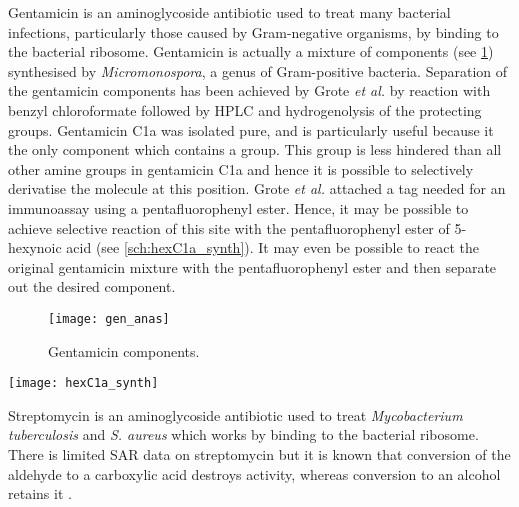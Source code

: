 Gentamicin is an aminoglycoside antibiotic used to treat many bacterial infections, particularly those caused by Gram-negative organisms, by binding to the bacterial ribosome. Gentamicin is actually a mixture of components (see \ref{fgr:gen_anas}) synthesised by \textit{Micromonospora}, a genus of Gram-positive bacteria. Separation of the gentamicin components has been achieved by Grote \textit{et al.} \cite{Grote2012} by reaction with benzyl chloroformate followed by HPLC and hydrogenolysis of the protecting groups. 
Gentamicin C1a  was isolated pure, and is particularly useful because it the only component which contains a  group. This group is less hindered than all other amine groups in gentamicin C1a  and hence it is possible to selectively derivatise the molecule at this position. Grote \textit{et al.} attached a tag needed for an immunoassay using a pentafluorophenyl ester\cite{Cheshev2010}. Hence, it may be possible to achieve selective reaction of this site with the pentafluorophenyl ester of 5-hexynoic acid  (see \ref{sch:hexC1a_synth}). It may even be possible to react the original gentamicin mixture with the pentafluorophenyl ester  and then separate out the desired component.

\begin{figure}[H]
	\begin{center}
		\texttt{[image: gen\_anas]}
		\caption{Gentamicin components. \label{fgr:gen_anas}} 
	\end{center}
\end{figure}

\begin{scheme}[H]
	\begin{center}
		\texttt{[image: hexC1a\_synth]}
		\caption{Proposed synthesis of gentamicin C1a derivative . a) DIPEA, DMF, - 55 $^{\circ}$C. \label{sch:hexC1a_synth}}
	\end{center}
\end{scheme}


Streptomycin  is an aminoglycoside antibiotic used to treat \textit{Mycobacterium tuberculosis} and \textit{S. aureus} which works by binding to the bacterial ribosome. There is limited SAR data on streptomycin but it is known that conversion of the aldehyde to a carboxylic acid destroys activity, whereas conversion to an alcohol retains it \cite{lemke2012foye}. 

